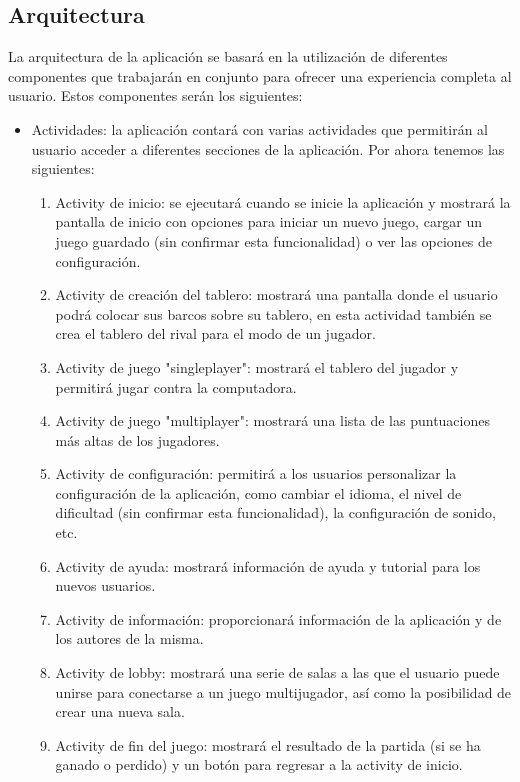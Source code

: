 \documentclass[a4paper, openright, 12pt]{article}
\begin{document}
\subsection{Arquitectura}
La arquitectura de la aplicación se basará en la utilización de diferentes componentes que trabajarán en conjunto para ofrecer una experiencia completa al usuario. Estos componentes serán los siguientes:
\begin{itemize}
    \item Actividades: la aplicación contará con varias actividades que permitirán al usuario acceder a diferentes secciones de la aplicación. Por ahora tenemos las siguientes:
        \begin{enumerate}
            \item Activity de inicio: se ejecutará cuando se inicie la aplicación y mostrará la pantalla de inicio con opciones para iniciar un nuevo juego, cargar un juego guardado (sin confirmar esta funcionalidad) o ver las opciones de configuración.
            \item Activity de creación del tablero: mostrará una pantalla donde el usuario podrá colocar sus barcos sobre su tablero, en esta actividad también se crea el tablero del rival para el modo de un jugador.
            \item Activity de juego "singleplayer": mostrará el tablero del jugador y permitirá jugar contra la computadora.
            \item Activity de juego "multiplayer": mostrará una lista de las puntuaciones más altas de los jugadores.
            \item Activity de configuración: permitirá a los usuarios personalizar la configuración de la aplicación, como cambiar el idioma, el nivel de dificultad (sin confirmar esta funcionalidad), la configuración de sonido, etc.
            \item Activity de ayuda: mostrará información de ayuda y tutorial para los nuevos usuarios.
            \item Activity de información: proporcionará información de la aplicación y de los autores de la misma.
            \item Activity de lobby: mostrará una serie de salas a las que el usuario puede unirse para conectarse a un juego multijugador, así como la posibilidad de crear una nueva sala.
            \item Activity de fin del juego: mostrará el resultado de la partida (si se ha ganado o perdido) y un botón para regresar a la activity de inicio.

\end{enumerate}
\end{itemize}
\end{document}

